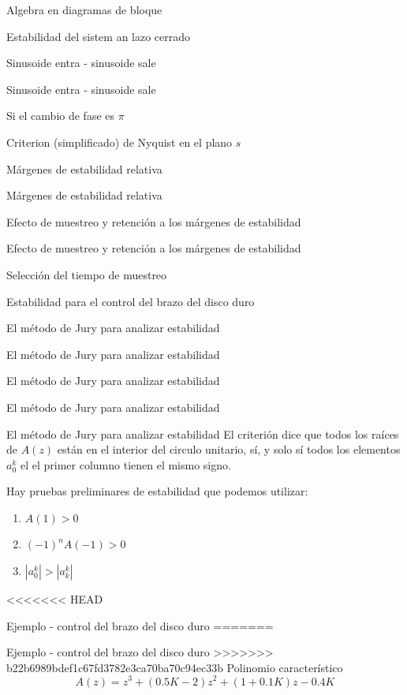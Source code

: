 \documentclass[presentation,aspectratio=169]{beamer}
\begin{document}
\begin{frame}[label={sec:org8e8e439}]{Algebra en diagramas de bloque}
\begin{frame}[label={sec:org5218f19}]{Estabilidad del sistem an lazo cerrado}
\begin{frame}[label={sec:org4ce2307}]{Sinusoide entra - sinusoide sale}
\begin{frame}[label={sec:orgc598966}]{Sinusoide entra - sinusoide sale}
\begin{frame}[label={sec:orgbd54147}]{Si el cambio de fase es \(\pi\)}
\begin{frame}[label={sec:orgf06388b}]{Criterion (simplificado) de Nyquist en el plano \(s\)}
\begin{frame}[label={sec:org5967884}]{Márgenes de estabilidad relativa}
\begin{frame}[label={sec:orgb5ba0e3}]{Márgenes de estabilidad relativa}
\begin{frame}[label={sec:orga8344a9}]{Efecto de muestreo y retención a los márgenes de estabilidad}
\begin{frame}[label={sec:org5e3653d}]{Efecto de muestreo y retención a los márgenes de estabilidad}
\begin{frame}[label={sec:orgd9a9d5d}]{Selección del tiempo de muestreo}
\begin{frame}[label={sec:org2cdebfb}]{Estabilidad para el control del brazo del disco duro}
\begin{frame}[label={sec:org6242817}]{El método de Jury para analizar estabilidad}
\begin{frame}[label={sec:org7c040d1}]{El método de Jury para analizar estabilidad}
\begin{frame}[label={sec:org85b11cd}]{El método de Jury para analizar estabilidad}
\begin{frame}[label={sec:org8bd183d}]{El método de Jury para analizar estabilidad}
\begin{frame}[label={sec:orgc830ada}]{El método de Jury para analizar estabilidad}
El criterión dice que todos los raíces de \(A(z)\) están en el interior del circulo unitario, sí, y solo sí todos los elementos \(a_0^k\) el el primer columno tienen el mismo signo. 

Hay pruebas preliminares de estabilidad que podemos utilizar:
\begin{enumerate}
\item \(A(1) > 0\)
\item \((-1)^nA(-1) > 0\)
\item \(|a_0^k| > |a_k^k|\)
\end{enumerate}
\end{frame}


<<<<<<< HEAD
\begin{frame}[label={sec:org4ec96eb}]{Ejemplo - control del brazo del disco duro}
=======
\begin{frame}[label={sec:org8a87cda}]{Ejemplo - control del brazo del disco duro}
>>>>>>> b22b6989bdef1c67fd3782e3ca70ba70c94ec33b
Polinomio característico \[ A(z) = z^3 + (0.5K-2)z^2 + (1+0.1K)z - 0.4K\]
\begin{center}

\end{center}
\end{frame}
\end{frame}
\end{frame}
\end{frame}
\end{frame}
\end{frame}
\end{frame}
\end{frame}
\end{frame}
\end{frame}
\end{frame}
\end{frame}
\end{frame}
\end{frame}
\end{frame}
\end{frame}
\end{frame}
\end{frame}
\end{document}

